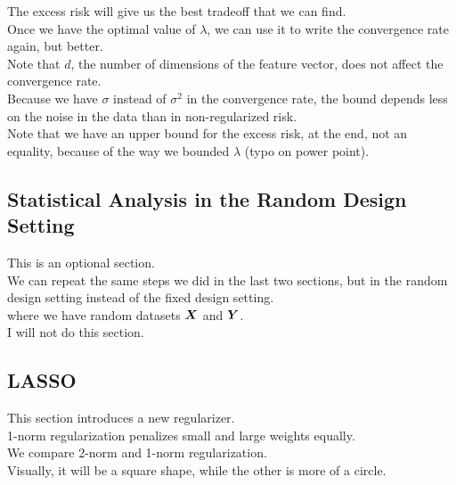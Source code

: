 \documentclass[12pt]{article}
\begin{document}
The excess risk will give us the best
tradeoff that we can find. \\

Once we have the optimal value of $\lambda$,
we can use it to write the convergence
rate again, but better. \\

Note that $d$, the number of dimensions of the feature
vector, does not affect the convergence rate. \\

Because we have $\sigma$ instead of $\sigma^2$
in the convergence rate, the bound depends less
on the noise in the data than in non-regularized 
risk. \\

Note that we have an upper bound for the excess risk,
at the end, not an equality, because of the way
we bounded $\lambda$ (typo on power point). \\

\newpage

\subsection*{Statistical Analysis in the Random 
Design Setting}

This is an optional section. \\

We can repeat the same steps we did in the last
two sections, but in the random design setting
instead of the fixed design setting. \\
where we have random datasets $\boldsymbol{X}$ and $\boldsymbol{Y}$. \\

I will not do this section. \\

\newpage

\subsection*{LASSO}

This section introduces a new regularizer. \\

1-norm regularization penalizes small and large
weights equally. \\

We compare 2-norm and 1-norm regularization. \\
Visually, it will be a square shape,
while the other is more of a circle. \\
\end{document}
